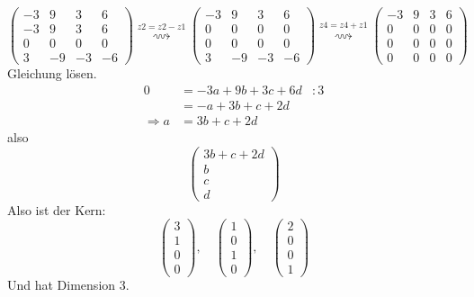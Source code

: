 \documentclass{article} %
\begin{document}
\[
\begin{pmatrix}
-3 & 9 & 3 & 6 \\
-3 & 9 & 3 & 6 \\
0 & 0 & 0 & 0 \\
3 & -9 & -3 & -6
\end{pmatrix}  \overset{z2=z2-z1}{\rightsquigarrow}
\begin{pmatrix}
-3 & 9 & 3 & 6 \\
0 & 0 & 0 & 0\\
0 & 0 & 0 & 0 \\
3 & -9 & -3 & -6
\end{pmatrix} \overset{z4=z4+z1}{\rightsquigarrow}
\begin{pmatrix}
-3 & 9 & 3 & 6 \\
0 & 0 & 0 & 0\\
0 & 0 & 0 & 0 \\
0 & 0 & 0 & 0
\end{pmatrix}
\]
Gleichung lösen. 
\begin{align*}
    0 &= -3a + 9b + 3c + 6d & :3 \\
    & = -a +3b +c+2d \\
    \Rightarrow a &= 3b +c+2d
\end{align*}
also 
\[
\begin{pmatrix}
3b +c+2d \\ b \\c \\d
\end{pmatrix}
\]
Also ist der Kern: 
\[
\begin{pmatrix}
3\\1\\0\\0
\end{pmatrix}, \quad \begin{pmatrix}
1\\0\\1\\0
\end{pmatrix}, \quad \begin{pmatrix}
2\\0\\0\\1
\end{pmatrix}
\]
Und hat Dimension 3. \\
\end{document}
